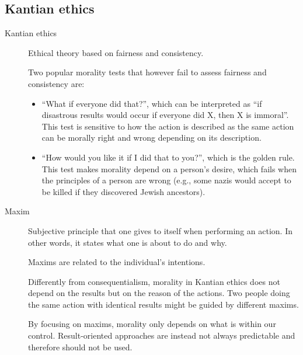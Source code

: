 \subsection{Kantian ethics}

\begin{description}
    \item[Kantian ethics] 
        Ethical theory based on fairness and consistency.

        \begin{remark}
            Two popular morality tests that however fail to assess fairness and consistency are:
            \begin{itemize}
                \item ``What if everyone did that?'', which can be interpreted as ``if disastrous results would occur if everyone did X, then X is immoral''. This test is sensitive to how the action is described as the same action can be morally right and wrong depending on its description.
                \item ``How would you like it if I did that to you?'', which is the golden rule. This test makes morality depend on a person's desire, which fails when the principles of a person are wrong (e.g., some nazis would accept to be killed if they discovered Jewish ancestors).
            \end{itemize}
        \end{remark}

    \item[Maxim] 
        Subjective principle that one gives to itself when performing an action. In other words, it states what one is about to do and why.

        \begin{remark}
            Maxims are related to the individual's intentions.
        \end{remark}

        \begin{remark}
            Differently from consequentialism, morality in Kantian ethics does not depend on the results but on the reason of the actions. Two people doing the same action with identical results might be guided by different maxims.
        \end{remark}

        \begin{remark}
            By focusing on maxims, morality only depends on what is within our control. Result-oriented approaches are instead not always predictable and therefore should not be used.
        \end{remark}


\end{description}
